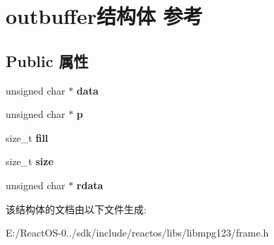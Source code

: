 \hypertarget{structoutbuffer}{}\section{outbuffer结构体 参考}
\label{structoutbuffer}
\subsection*{Public 属性}
\begin{DoxyCompactItemize}
\item 
\mbox{\label{structoutbuffer_a66c644780861d8f9f52fde97b92b1457}} 
unsigned char $\ast$ {\bfseries data}
\item 
\mbox{\label{structoutbuffer_a1062f3beda283e2d1c0b997ab2dedf72}} 
unsigned char $\ast$ {\bfseries p}
\item 
\mbox{\label{structoutbuffer_a2303ec33c4d87cb4fa26bda329b3096a}} 
size\+\_\+t {\bfseries fill}
\item 
\mbox{\label{structoutbuffer_a337a38a02def9a81b4564d00bf908170}} 
size\+\_\+t {\bfseries size}
\item 
\mbox{\label{structoutbuffer_ad50281fc08f17c4f742ee5d3c014f9b1}} 
unsigned char $\ast$ {\bfseries rdata}
\end{DoxyCompactItemize}


该结构体的文档由以下文件生成\+:\begin{DoxyCompactItemize}
\item 
E\+:/\+React\+O\+S-\/0../sdk/include/reactos/libs/libmpg123/frame.\+h\end{DoxyCompactItemize}
